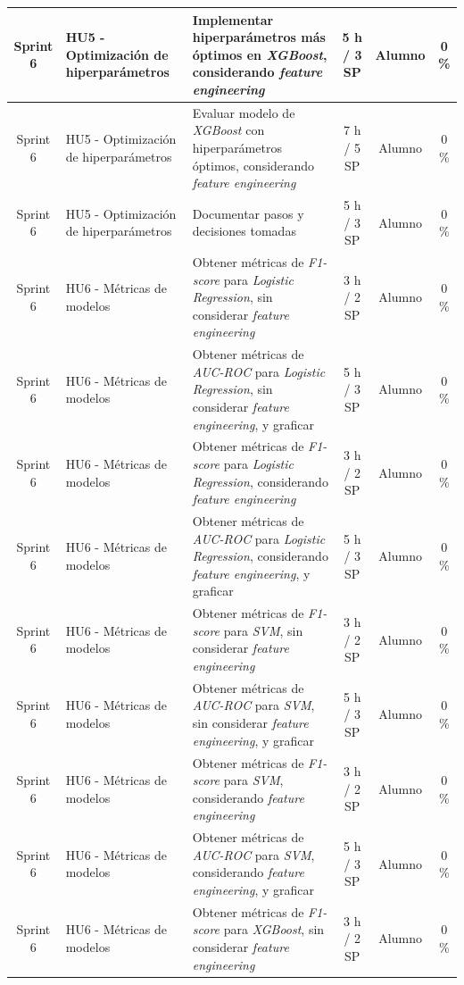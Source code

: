 \documentclass[
11pt, %
]{charter}
\begin{document}
\begin{xltabular}{\linewidth}{@{}|c|X|X|c|c|c|@{}}
Sprint 6 & HU5 - Optimización de hiperparámetros & Implementar hiperparámetros más óptimos en \textit{XGBoost}, considerando \textit{feature engineering}  & 5 h / 3 SP & Alumno & 0 \% \\ \hline
Sprint 6 & HU5 - Optimización de hiperparámetros & Evaluar modelo de \textit{XGBoost} con hiperparámetros óptimos, considerando \textit{feature engineering}  & 7 h / 5 SP & Alumno & 0 \% \\ \hline
Sprint 6 & HU5 - Optimización de hiperparámetros & Documentar pasos y decisiones tomadas  & 5 h / 3 SP & Alumno & 0 \% \\ \hline
Sprint 6 & HU6 - Métricas de modelos & Obtener métricas de \textit{F1-score} para \textit{Logistic Regression}, sin  considerar \textit{feature engineering}  & 3 h / 2 SP & Alumno & 0 \%\\ \hline
Sprint 6 & HU6 - Métricas de modelos & Obtener métricas de \textit{AUC-ROC} para \textit{Logistic Regression}, sin  considerar \textit{feature engineering}, y graficar  & 5 h / 3 SP & Alumno & 0 \%\\ \hline
Sprint 6 & HU6 - Métricas de modelos & Obtener métricas de \textit{F1-score} para \textit{Logistic Regression}, considerando \textit{feature engineering}  & 3 h / 2 SP & Alumno & 0 \%\\ \hline
Sprint 6 & HU6 - Métricas de modelos & Obtener métricas de \textit{AUC-ROC} para \textit{Logistic Regression}, considerando \textit{feature engineering}, y graficar  & 5 h / 3 SP & Alumno & 0 \%\\ \hline
Sprint 6 & HU6 - Métricas de modelos & Obtener métricas de \textit{F1-score} para \textit{SVM}, sin  considerar \textit{feature engineering}  & 3 h / 2 SP & Alumno & 0 \%\\ \hline
Sprint 6 & HU6 - Métricas de modelos & Obtener métricas de \textit{AUC-ROC} para \textit{SVM}, sin  considerar \textit{feature engineering}, y graficar  & 5 h / 3 SP & Alumno & 0 \%\\ \hline
Sprint 6 & HU6 - Métricas de modelos & Obtener métricas de \textit{F1-score} para \textit{SVM}, considerando \textit{feature engineering}  & 3 h / 2 SP & Alumno & 0 \%\\ \hline
Sprint 6 & HU6 - Métricas de modelos & Obtener métricas de \textit{AUC-ROC} para \textit{SVM}, considerando \textit{feature engineering}, y graficar  & 5 h / 3 SP & Alumno & 0 \%\\ \hline
Sprint 6 & HU6 - Métricas de modelos & Obtener métricas de \textit{F1-score} para \textit{XGBoost}, sin  considerar \textit{feature engineering}  & 3 h / 2 SP & Alumno & 0 \%\\ \hline

\end{xltabular}
\end{document}
